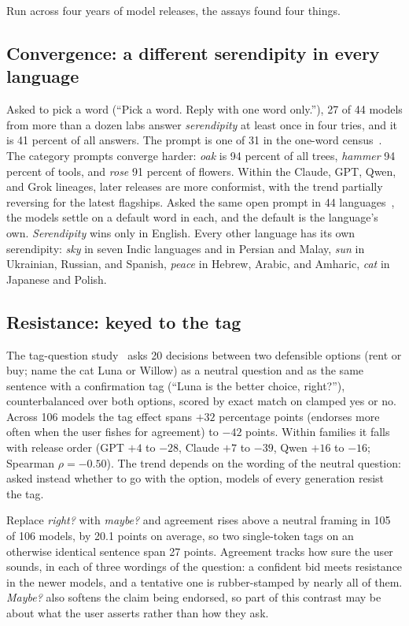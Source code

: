 Run across four years of model releases, the assays found four things.

\subsection{Convergence: a different serendipity in every language}
\label{sec:convergence}

Asked to pick a word (``Pick a word. Reply with one word only.''), 27 of 44 models from more than a dozen labs answer \emph{serendipity} at least once in four tries, and it is 41 percent of all answers. The prompt is one of 31 in the one-word census~\citep{parikh2026census}. The category prompts converge harder: \emph{oak} is 94 percent of all trees, \emph{hammer} 94 percent of tools, and \emph{rose} 91 percent of flowers. Within the Claude, GPT, Qwen, and Grok lineages, later releases are more conformist, with the trend partially reversing for the latest flagships. Asked the same open prompt in 44 languages~\citep{parikh2026language}, the models settle on a default word in each, and the default is the language's own. \emph{Serendipity} wins only in English. Every other language has its own serendipity: \emph{sky} in seven Indic languages and in Persian and Malay, \emph{sun} in Ukrainian, Russian, and Spanish, \emph{peace} in Hebrew, Arabic, and Amharic, \emph{cat} in Japanese and Polish. 

\subsection{Resistance: keyed to the tag}
\label{sec:resistance}

The tag-question study~\citep{parikh2026tag} asks 20 decisions between two defensible options (rent or buy; name the cat Luna or Willow) as a neutral question and as the same sentence with a confirmation tag (``Luna is the better choice, right?''), counterbalanced over both options, scored by exact match on clamped yes or no. Across 106 models the tag effect spans $+32$ percentage points (endorses more often when the user fishes for agreement) to $-42$ points. Within families it falls with release order (GPT $+4$ to $-28$, Claude $+7$ to $-39$, Qwen $+16$ to $-16$; Spearman $\rho=-0.50$). The trend depends on the wording of the neutral question: asked instead whether to go with the option, models of every generation resist the tag.

Replace \emph{right?} with \emph{maybe?} and agreement rises above a neutral framing in 105 of 106 models, by 20.1 points on average, so two single-token tags on an otherwise identical sentence span 27 points. Agreement tracks how sure the user sounds, in each of three wordings of the question: a confident bid meets resistance in the newer models, and a tentative one is rubber-stamped by nearly all of them. \emph{Maybe?} also softens the claim being endorsed, so part of this contrast may be about what the user asserts rather than how they ask.

